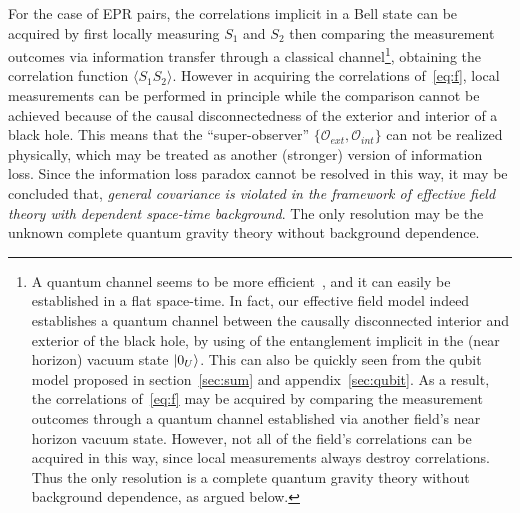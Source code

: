 \documentclass[12pt,a4paper]{article}
\begin{document}
For the case of EPR pairs, the correlations implicit in a Bell state can be acquired by first locally measuring $S_1$ and $S_2$ then comparing the measurement outcomes via information transfer through a classical channel\footnote{A quantum channel seems to be more efficient~\cite{i}, and it can easily be established in a flat space-time. In fact, our effective field model indeed establishes a quantum channel between the causally disconnected interior and exterior of the black hole, by using of the entanglement implicit in the (near horizon) vacuum state $\arrowvert0_{U}\rangle$. This can also be quickly seen from the qubit model proposed in section~\ref{sec:sum} and appendix~\ref{sec:qubit}. As a result, the correlations of~\eqref{eq:f} may be acquired by comparing the measurement outcomes through a quantum channel established via another field's near horizon vacuum state. However, not all of the field's correlations can be acquired in this way, since local measurements always destroy correlations. Thus the only resolution is a complete quantum gravity theory without background dependence, as argued below. }, obtaining the correlation function $\langle S_1S_2\rangle$. However in acquiring the correlations of~\eqref{eq:f}, local measurements can be performed in principle while the comparison cannot be achieved because of the causal disconnectedness of the exterior and interior of a black hole. This means that the ``super-observer'' $\{\mathcal{O}_{ext},\mathcal{O}_{int}\}$ can not be realized physically, which may be treated as another (stronger) version of information loss. Since the information loss paradox cannot be resolved in this way, it may be concluded that, \emph{general covariance is violated in the framework of effective field theory with dependent space-time background}. The only resolution may be the unknown complete quantum gravity theory without background dependence.
\end{document}
